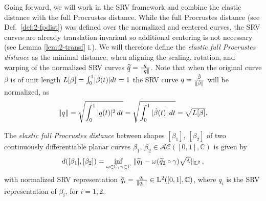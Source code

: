 Going forward, we will work in the SRV framework and combine the elastic distance with the full Procrustes distance.
While the full Procrustes distance (see Def.\ \ref{def:2-fpdist}) was defined over the normalized and centered curves, the SRV curves are already translation invariant so additional centering is not necessary (see Lemma \ref{lem:2-transf} i.).
We will therefore define the \emph{elastic full Procrustes distance} as the minimal distance, when aligning the scaling, rotation, and warping of the normalized SRV curves $\widetilde q = \frac{q}{\lVert q\rVert}$.
Note that when the original curve $\beta$ is of unit length $L[\beta] = \int_0^1 \lvert\dot\beta(t)\rvert dt = 1$ the SRV curve $q = \frac{\dot\beta}{\lVert\dot\beta\rVert}$ will be normalized, as 
\begin{equation}
  \label{eq:2-norm}
  \lVert q\rVert = \sqrt{ \int_0^1 |q(t)|^2 \, dt} = \sqrt{\int_0^1 |\dot{\beta}(t)| \, dt} = \sqrt{L[\beta]}.
\end{equation}

\begin{definition}
  \label{def:2-elfpdist}
  The \emph{elastic full Procrustes distance} between shapes $[\beta_1]$, $[\beta_2]$ of two continuously differentiable planar curves $\beta_1$, $\beta_2 \in \mathcal{AC}([0,1],\mathbb{C})$  is given by 
    \begin{equation}
      \label{eq:2-elfpdist-def}
      d([\beta_1], [\beta_2]) = \inf_{\omega \in \mathbb{C},\, \gamma \in \Gamma} \,\, \lVert\widetilde q_1 - \omega (\widetilde q_2 \circ \gamma) \sqrt{\dot\gamma}\rVert_{\mathbb{L}^2}\,,
    \end{equation}
    with normalized SRV representation $\widetilde q_{i} = \frac{q_{i}}{\lVert q_{i}\rVert} \in \mathbb{L}^2([0,1], \mathbb{C})$, where $q_i$ is the SRV representation of $\beta_i$, for $i = 1,2$.
\end{definition}

